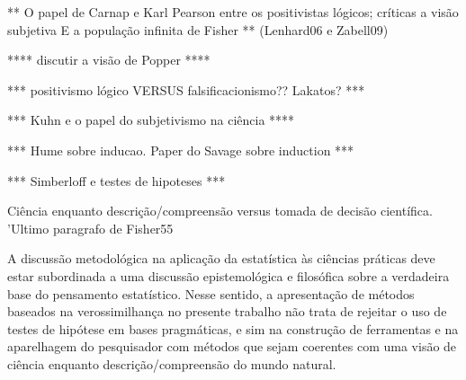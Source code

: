 \documentclass[12pt,a4paper]{article}
\begin{document}
** O papel de Carnap e Karl Pearson entre os positivistas lógicos; críticas a visão subjetiva E a população infinita de Fisher **
(Lenhard06 e Zabell09)

**** discutir a visão de Popper ****

*** positivismo lógico VERSUS falsificacionismo?? Lakatos? ***

*** Kuhn e o papel do subjetivismo na ciência ****

*** Hume sobre inducao. Paper do Savage sobre induction ***

*** Simberloff e testes de hipoteses ***

Ciência enquanto descrição/compreensão versus tomada de decisão científica. 'Ultimo paragrafo de Fisher55

A discussão metodológica na aplicação da estatística às ciências práticas deve estar subordinada a uma discussão
epistemológica e filosófica sobre a verdadeira base do pensamento estatístico. Nesse sentido, a apresentação de
métodos baseados na verossimilhança no presente trabalho não trata de rejeitar o uso de testes de hipótese em
bases pragmáticas, e sim na construção de ferramentas e na aparelhagem do pesquisador com métodos que sejam
coerentes com uma visão de ciência enquanto descrição/compreensão do mundo natural.



\end{document}
